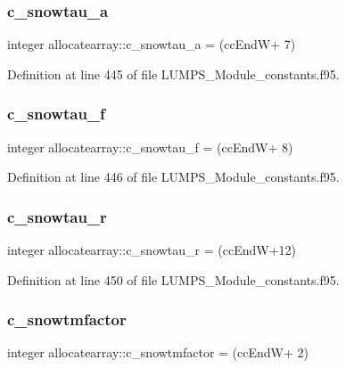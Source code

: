 \subsubsection{\texorpdfstring{c\+\_\+snowtau\+\_\+a}{c\_snowtau\_a}}
{\footnotesize\ttfamily integer allocatearray\+::c\+\_\+snowtau\+\_\+a = (cc\+EndW+ 7)}



Definition at line 445 of file L\+U\+M\+P\+S\+\_\+\+Module\+\_\+constants.\+f95.

\mbox{\label{namespaceallocatearray_a69df173e9777ee44bef7a9ffe6254b33}} 
\subsubsection{\texorpdfstring{c\+\_\+snowtau\+\_\+f}{c\_snowtau\_f}}
{\footnotesize\ttfamily integer allocatearray\+::c\+\_\+snowtau\+\_\+f = (cc\+EndW+ 8)}



Definition at line 446 of file L\+U\+M\+P\+S\+\_\+\+Module\+\_\+constants.\+f95.

\mbox{\label{namespaceallocatearray_a3ca258b93aa4dd7d60ffad4b6f975f84}} 
\subsubsection{\texorpdfstring{c\+\_\+snowtau\+\_\+r}{c\_snowtau\_r}}
{\footnotesize\ttfamily integer allocatearray\+::c\+\_\+snowtau\+\_\+r = (cc\+EndW+12)}



Definition at line 450 of file L\+U\+M\+P\+S\+\_\+\+Module\+\_\+constants.\+f95.

\mbox{\label{namespaceallocatearray_ab9775d921ab8069a25db5abdd6016153}} 
\subsubsection{\texorpdfstring{c\+\_\+snowtmfactor}{c\_snowtmfactor}}
{\footnotesize\ttfamily integer allocatearray\+::c\+\_\+snowtmfactor = (cc\+EndW+ 2)}



